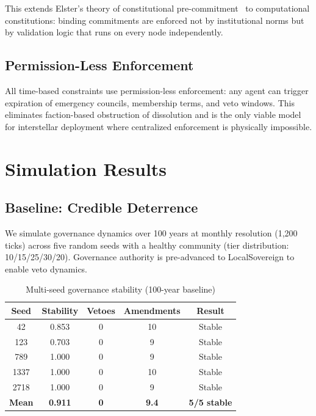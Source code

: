 \documentclass[11pt,a4paper]{article}
\begin{document}
This extends Elster's theory of constitutional pre-commitment~\cite{elster} to computational constitutions: binding commitments are enforced not by institutional norms but by validation logic that runs on every node independently.

\subsection{Permission-Less Enforcement}

All time-based constraints use permission-less enforcement: any agent can trigger expiration of emergency councils, membership terms, and veto windows. This eliminates faction-based obstruction of dissolution and is the only viable model for interstellar deployment where centralized enforcement is physically impossible.

\section{Simulation Results}
\label{sec:simulation}

\subsection{Baseline: Credible Deterrence}

We simulate governance dynamics over 100 years at monthly resolution (1,200 ticks) across five random seeds with a healthy community (tier distribution: 10/15/25/30/20). Governance authority is pre-advanced to LocalSovereign to enable veto dynamics.

\begin{table}[h]
\centering
\caption{Multi-seed governance stability (100-year baseline)}
\label{tab:baseline}
\begin{tabular}{ccccc}
\toprule
\textbf{Seed} & \textbf{Stability} & \textbf{Vetoes} & \textbf{Amendments} & \textbf{Result} \\
\midrule
42 & 0.853 & 0 & 10 & Stable \\
123 & 0.703 & 0 & 9 & Stable \\
789 & 1.000 & 0 & 9 & Stable \\
1337 & 1.000 & 0 & 10 & Stable \\
2718 & 1.000 & 0 & 9 & Stable \\
\midrule
\textbf{Mean} & \textbf{0.911} & \textbf{0} & \textbf{9.4} & \textbf{5/5 stable} \\
\bottomrule
\end{tabular}
\end{table}
\end{document}

